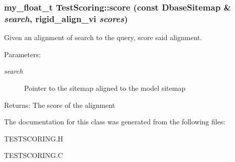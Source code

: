 \subsubsection{\setlength{\rightskip}{0pt plus 5cm}my\_\-float\_\-t Test\-Scoring::score (const \bf{Dbase\-Sitemap} \& {\em search}, rigid\_\-align\_\-vi {\em scores})\hspace{0.3cm}{\tt  [protected]}}\label{classSimSite3D_1_1TestScoring_e0e06721302874c8daff87995f2609b9}


Given an alignment of search to the query, score said alignment. 

\begin{Desc}
\item[Parameters:]
\begin{description}
\item[{\em search}]Pointer to the sitemap aligned to the model sitemap \end{description}
\end{Desc}
\begin{Desc}
\item[Returns:]The score of the alignment \end{Desc}


The documentation for this class was generated from the following files:\begin{CompactItemize}
\item 
TESTSCORING.H\item 
TESTSCORING.C\end{CompactItemize}
